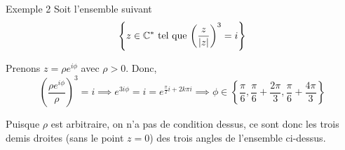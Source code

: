 \documentclass[a4paper]{article}
\begin{document}
\begin{parag}{Exemple 2}
    Soit l'ensemble suivant
    \[\left\{z \in \mathbb{C}^* \telque \left(\frac{z}{\left|z\right|}\right)^3 = i\right\}\]

    Prenons $z = \rho e^{i\phi}$ avec $\rho > 0$. Donc,
    \[\left(\frac{\rho e^{i\phi}}{\rho}\right)^3 = i \implies e^{3i\phi} = i = e^{\frac{\pi}{2}i + 2k\pi i} \implies \phi \in \left\{\frac{\pi}{6}, \frac{\pi}{6} + \frac{2\pi}{3}, \frac{\pi}{6} + \frac{4\pi}{3}\right\}\]

    Puisque $\rho$ est arbitraire, on n'a pas de condition dessus, ce sont donc les trois demis droites (sans le point $z = 0$) des trois angles de l'ensemble ci-dessus.

\end{parag}
\end{document}
